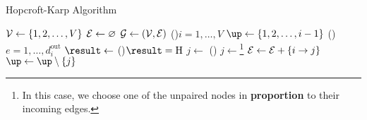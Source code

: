 \par
\begin{algorithm}[H]\label{algo:Hopcroft-Karp-algo}
	\DontPrintSemicolon
	\caption{Hopcroft-Karp Algorithm}
	\BlankLine

	\(\mathcal{\MakeUppercase{v}} \gets \{1, 2, \ldots , V\}\)\;
	\(\mathcal{\MakeUppercase{e}} \gets \varnothing\)\;
	\(\mathcal{\MakeUppercase{g}} \gets (\mathcal{\MakeUppercase{v}} , \mathcal{\MakeUppercase{e}} )\) 
	\;
	\For(){\(i = 1, \ldots  , V\) }{
	\(\up\gets \{1, 2, \ldots , i-1 \}\)
	\For(){\(e = 1, \ldots, d^{\text{out}}_i\) }{
	\(\result\gets\) 
	\uIf(){\(\result = \mathrm{H}\) }{
		\(j\gets\)\rand{\(\up\) }
	}\Else(){
	\(j\gets \)\footnote{In this case, we choose one of the unpaired nodes in \textbf{proportion} to their incoming edges.}\;
	}
	\;
	\(\mathcal{\MakeUppercase{e}} \gets \mathcal{\MakeUppercase{e}} + \{i \to j\}\)
	\(\up\gets \up \setminus \{j\}\)
	}
	}

	\;
\end{algorithm}

